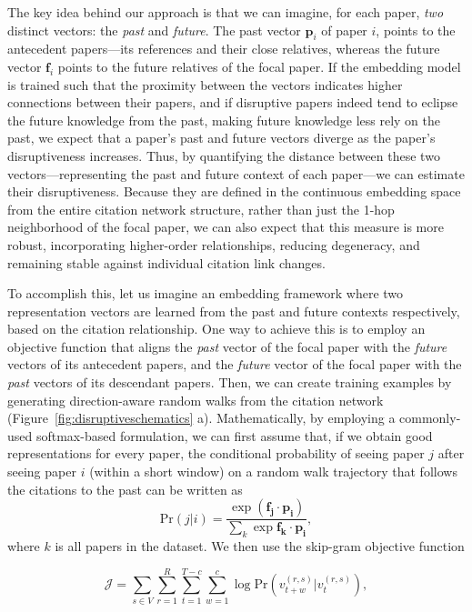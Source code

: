 \documentclass[12pt]{article}
\begin{document}
The key idea behind our approach is that we can imagine, for each paper, \emph{two} distinct vectors: the \emph{past} and \emph{future}. The past vector $\mathbf{p}_i$ of paper $i$, points to the antecedent papers---its references and their close relatives, whereas the future vector $\mathbf{f}_i$ points to the future relatives of the focal paper. If the embedding model is trained such that the proximity between the vectors indicates higher connections between their papers, and if disruptive papers indeed tend to eclipse the future knowledge from the past, making future knowledge less rely on the past, we expect that a paper’s past and future vectors diverge as the paper’s disruptiveness increases. Thus, by quantifying the distance between these two vectors---representing the past and future context of each paper---we can estimate their disruptiveness. Because they are defined in the continuous embedding space from the entire citation network structure, rather than just the 1-hop neighborhood of the focal paper, we can also expect that this measure is more robust, incorporating higher-order relationships, reducing degeneracy, and remaining stable against individual citation link changes.



To accomplish this, let us imagine an embedding framework where two representation vectors are learned from the past and future contexts respectively, based on the citation relationship. One way to achieve this is to employ an objective function that aligns the \emph{past} vector of the focal paper with the \emph{future} vectors of its antecedent papers, and the \emph{future} vector of the focal paper with the \emph{past} vectors of its descendant papers. Then, we can create training examples by generating direction-aware random walks from the citation network (Figure~\ref{fig:disruptiveschematics} a). Mathematically, by employing a commonly-used softmax-based formulation, we can first assume that, if we obtain good representations for every paper, the conditional probability of seeing paper $j$ after seeing paper $i$ (within a short window) on a random walk trajectory that follows the citations to the past can be written as 
\begin{equation}
    \text{Pr}(j|i) = \frac{\exp{(\mathbf{f_j} \cdot \mathbf{p_i})}}{\sum_k \exp{\mathbf{f_k} \cdot\mathbf{p_i}} },
\end{equation}
where $k$ is all papers in the dataset. We then use the skip-gram objective function

\begin{equation}\label{eqn:objective_randomwalk}
\mathcal{J} = \sum_{s \in V} \sum_{r=1}^{R} \sum_{t=1}^{T - c} \sum_{w=1}^{c} \log \text{Pr}(v_{t+w}^{(r, s)} | v_t^{(r, s)}),
\end{equation}
\end{document}
